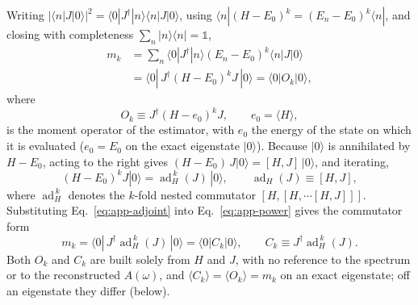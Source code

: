 \documentclass[submission, PhysCore]{SciPost}
\newcommand{\openone}{\mathds{1}}%
\begin{document}
\begin{appendix}
Writing $|\langle n|J|0\rangle|^2=\langle 0|J^\dagger|n\rangle\langle n|J|0\rangle$, using $\langle n|(H-E_0)^k=(E_n-E_0)^k\langle n|$, and closing with completeness $\sum_n|n\rangle\langle n|=\openone$,
\begin{equation}
\begin{aligned}
m_k&=\sum_n\langle 0|J^\dagger|n\rangle(E_n-E_0)^k\langle n|J|0\rangle\\
&=\langle 0|\,J^\dagger(H-E_0)^kJ\,|0\rangle=\langle 0|O_k|0\rangle ,
\end{aligned}
\label{eq:app-power}
\end{equation}
where
\[
O_k\equiv J^\dagger(H-e_0)^kJ,\qquad e_0=\langle H\rangle ,
\]
is the moment operator of the estimator, with $e_0$ the energy of the state on which it is evaluated ($e_0=E_0$ on the exact eigenstate $|0\rangle$). Because $|0\rangle$ is annihilated by $H-E_0$, acting to the right gives $(H-E_0)\,J|0\rangle=[H,J]\,|0\rangle$, and iterating,
\begin{equation}
(H-E_0)^k J|0\rangle=\operatorname{ad}_H^{\,k}(J)\,|0\rangle,\qquad \operatorname{ad}_H(J)\equiv[H,J],
\label{eq:app-adjoint}
\end{equation}
where $\operatorname{ad}_H^{\,k}$ denotes the $k$-fold nested commutator $[H,[H,\cdots[H,J]]]$. Substituting Eq.~\eqref{eq:app-adjoint} into Eq.~\eqref{eq:app-power} gives the commutator form
\begin{equation}
m_k=\langle 0|\,J^\dagger\operatorname{ad}_H^{\,k}(J)\,|0\rangle=\langle 0|C_k|0\rangle,\qquad C_k\equiv J^\dagger\operatorname{ad}_H^{\,k}(J).
\label{eq:app-commutator}
\end{equation}
Both $O_k$ and $C_k$ are built solely from $H$ and $J$, with no reference to the spectrum or to the reconstructed $A(\omega)$, and $\langle C_k\rangle=\langle O_k\rangle=m_k$ on an exact eigenstate; off an eigenstate they differ (below).


\end{appendix}
\end{document}
